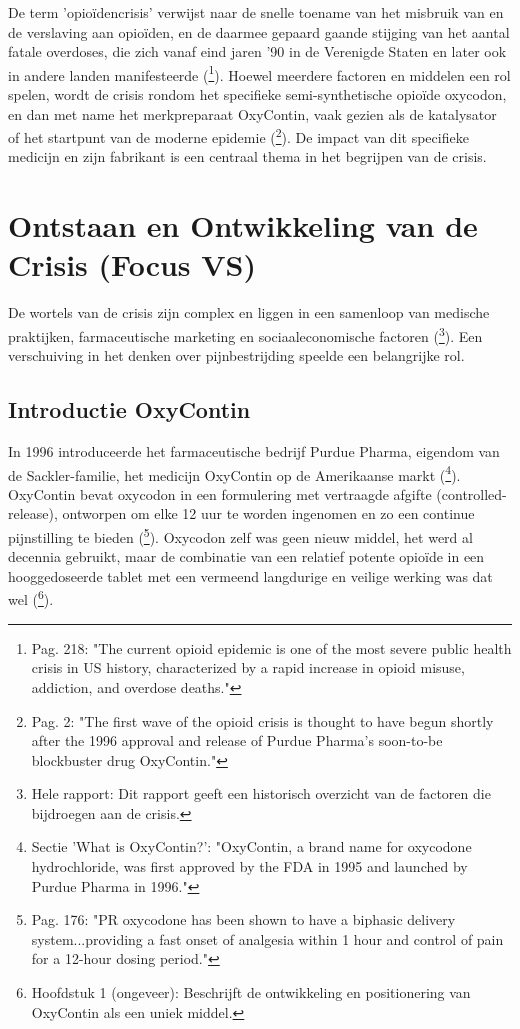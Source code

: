 \documentclass[11pt, a4paper]{report} %
\begin{document}
De term 'opioïdencrisis' verwijst naar de snelle toename van het misbruik van en de verslaving aan opioïden, en de daarmee gepaard gaande stijging van het aantal fatale overdoses, die zich vanaf eind jaren '90 in de Verenigde Staten en later ook in andere landen manifesteerde (\cite{Volkow2021ChangingOpioidCrisis}\footnote{Pag. 218: "The current opioid epidemic is one of the most severe public health crisis in US history, characterized by a rapid increase in opioid misuse, addiction, and overdose deaths."}). Hoewel meerdere factoren en middelen een rol spelen, wordt de crisis rondom het specifieke semi-synthetische opioïde oxycodon, en dan met name het merkpreparaat OxyContin, vaak gezien als de katalysator of het startpunt van de moderne epidemie (\cite{Maclean2020EconomicStudiesOpioid}\footnote{Pag. 2: "The first wave of the opioid crisis is thought to have begun shortly after the 1996 approval and release of Purdue Pharma’s soon-to-be blockbuster drug OxyContin."}). De impact van dit specifieke medicijn en zijn fabrikant is een centraal thema in het begrijpen van de crisis.

\section{Ontstaan en Ontwikkeling van de Crisis (Focus VS)}
De wortels van de crisis zijn complex en liggen in een samenloop van medische praktijken, farmaceutische marketing en sociaaleconomische factoren (\cite{CRS2022OpioidCrisisHistory}\footnote{Hele rapport: Dit rapport geeft een historisch overzicht van de factoren die bijdroegen aan de crisis.}). Een verschuiving in het denken over pijnbestrijding speelde een belangrijke rol.

\subsection{Introductie OxyContin}
In 1996 introduceerde het farmaceutische bedrijf Purdue Pharma, eigendom van de Sackler-familie, het medicijn OxyContin op de Amerikaanse markt (\cite{HealthlineDopesickTruth}\footnote{Sectie 'What is OxyContin?': "OxyContin, a brand name for oxycodone hydrochloride, was first approved by the FDA in 1995 and launched by Purdue Pharma in 1996."}). OxyContin bevat oxycodon in een formulering met vertraagde afgifte (controlled-release), ontworpen om elke 12 uur te worden ingenomen en zo een continue pijnstilling te bieden (\cite{Riley2008OxycodoneReview}\footnote{Pag. 176: "PR oxycodone has been shown to have a biphasic delivery system...providing a fast onset of analgesia within 1 hour and control of pain for a 12-hour dosing period."}). Oxycodon zelf was geen nieuw middel, het werd al decennia gebruikt, maar de combinatie van een relatief potente opioïde in een hooggedoseerde tablet met een vermeend langdurige en veilige werking was dat wel (\cite{Macy2018Dopesick}\footnote{Hoofdstuk 1 (ongeveer): Beschrijft de ontwikkeling en positionering van OxyContin als een uniek middel.}).
\end{document}
